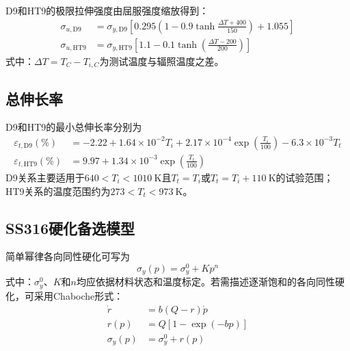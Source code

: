 D9和HT9的极限拉伸强度由屈服强度缩放得到：
\begin{equation}
	\label{eq:appendix_d9_ht9_ultimate_strength}
	\begin{aligned}
		\sigma_{u,\mathrm{D9}}
		&=\sigma_{y,\mathrm{D9}}
		\left[
		0.295\left(1-0.9\tanh\frac{\Delta T+400}{150}\right)
		+1.055
		\right]\\
		\sigma_{u,\mathrm{HT9}}
		&=\sigma_{y,\mathrm{HT9}}
		\left[
		1.1-0.1\tanh\!\left(\frac{\Delta T-200}{200}\right)
		\right]
	\end{aligned}
\end{equation}
式中：$\Delta T=T_C-T_{i,C}$为测试温度与辐照温度之差。

\subsection{总伸长率}

D9和HT9的最小总伸长率分别为
\begin{equation}
	\label{eq:appendix_d9_ht9_total_elongation}
	\begin{aligned}
		\varepsilon_{t,\mathrm{D9}}(\%)
		&=-2.22+1.64\times10^{-2}T_i
		+2.17\times10^{-4}\exp\!\left(\frac{T_i}{100}\right)
		-6.3\times10^{-3}T_t\\
		\varepsilon_{t,\mathrm{HT9}}(\%)
		&=9.97+1.34\times10^{-3}
		\exp\!\left(\frac{T_t}{100}\right)
	\end{aligned}
\end{equation}
D9关系主要适用于$640<T_i<1010\ \mathrm{K}$且$T_t=T_i$或$T_t=T_i+110\ \mathrm{K}$的试验范围；HT9关系的温度范围约为$273<T_t<973\ \mathrm{K}$。

\subsection{SS316硬化备选模型}

简单幂律各向同性硬化可写为
\begin{equation}
	\sigma_y(p)=\sigma_y^0+Kp^n
	\label{eq:appendix_ss316_power_hardening}
\end{equation}
式中：$\sigma_y^0$、$K$和$n$均应依据材料状态和温度标定。若需描述逐渐饱和的各向同性硬化，可采用Chaboche形式：
\begin{equation}
	\label{eq:appendix_ss316_chaboche_isotropic_hardening}
	\begin{aligned}
		\dot r&=b(Q-r)\dot p\\
		r(p)&=Q[1-\exp(-bp)]\\
		\sigma_y(p)&=\sigma_y^0+r(p)
	\end{aligned}
\end{equation}


